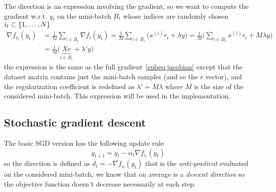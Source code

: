 The direction is an expression involving the gradient, so we want to compute the gradient w.r.t. $y_t$ on the mini-batch $B_t$ whose indices are randomly chosen $i_t\subset\{1,\dots,N\}$
\begin{equation*}
\begin{split}
\nabla f_{i_t}(y_t) &= \frac{1}{M}\sum_{i\in B_t}\nabla f_i(y_t)=\frac{1}{M}\sum_{i\in B_t}\bigl(x^{(i)}r_i+\lambda y\bigr)= \frac{1}{M}\biggl(\sum_{i\in B_t}x^{(i)}r_i+M\lambda y\biggr) \\
&= \frac{1}{M}\bigl(\underbrace{Xr}_{i\in B_t}+\lambda'y\bigr)
\end{split}
\end{equation*}
the expression is the same as the full gradient~\eqref{subeq:jacobian} except that the dataset matrix contains just the mini-batch samples (and so the $r$ vector), and the regularization coefficient is redefined as $\lambda'=M\lambda$ where $M$ is the size of the considered mini-batch. This expression will be used in the implementation.




\subsection{Stochastic gradient descent}\label{subsc:sgd}

The basic SGD version has the following update rule
\begin{equation}\label{eq:sgd-base}
y_{t+1}=y_t-\alpha_t\nabla f_{i_t}(y_t)
\end{equation}
so the direction is defined as $d_t=-\nabla f_{i_t}(y_t)$ that is the \emph{anti-gradient} evaluated on the considered mini-batch, we know that on average is a \emph{descent direction} so the objective function doesn't decrease necessarily at each step.

